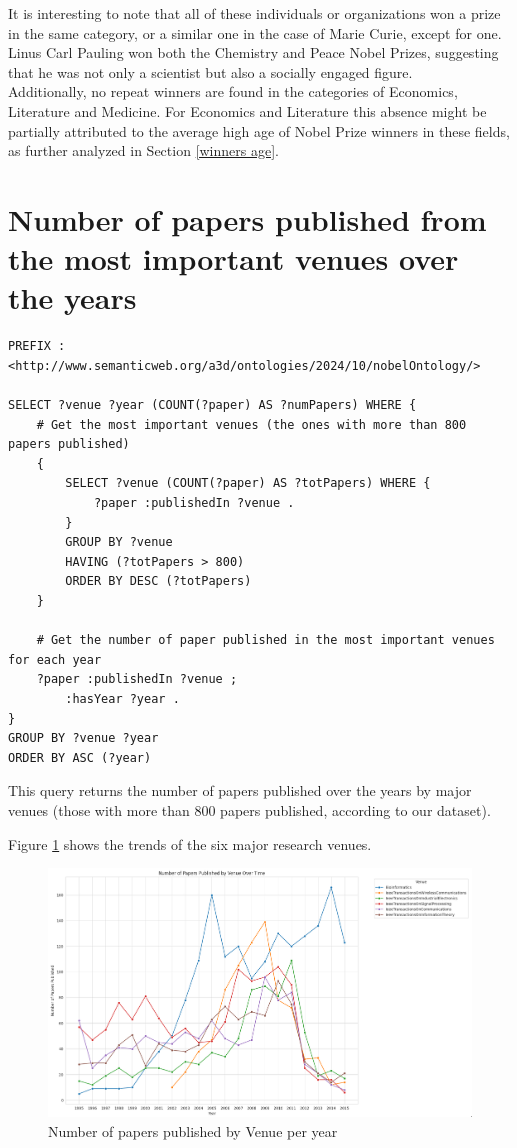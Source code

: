 \documentclass{article}
\begin{document}
It is interesting to note that all of these individuals or organizations won a prize in the same category,
or a similar one in the case of Marie Curie, except for one. Linus Carl Pauling won both the Chemistry and Peace Nobel Prizes,
suggesting that he was not only a scientist but also a socially engaged figure.\\
Additionally, no repeat winners are found in the categories of Economics, Literature and Medicine.
For Economics and Literature this absence might be partially attributed to the average high age of Nobel Prize
winners in these fields, as further analyzed in Section \ref{winners age}.\\

\newpage

\section{Number of papers published from the most important venues over the years}

\begin{lstlisting}
PREFIX : <http://www.semanticweb.org/a3d/ontologies/2024/10/nobelOntology/>

SELECT ?venue ?year (COUNT(?paper) AS ?numPapers) WHERE {
    # Get the most important venues (the ones with more than 800 papers published)
    {
        SELECT ?venue (COUNT(?paper) AS ?totPapers) WHERE {
            ?paper :publishedIn ?venue .
        }
        GROUP BY ?venue
        HAVING (?totPapers > 800)
        ORDER BY DESC (?totPapers)
    }

    # Get the number of paper published in the most important venues for each year
    ?paper :publishedIn ?venue ;
        :hasYear ?year .
}
GROUP BY ?venue ?year
ORDER BY ASC (?year)
\end{lstlisting}

\vspace{1em}

This query returns the number of papers published over the years by major
venues (those with more than 800 papers published, according to our dataset).

Figure \ref{fig:papersPerVenue} shows the trends of the six major research venues.

\begin{figure}[H]
	\centering
	\label{fig:papersPerVenue}
	\includegraphics[width=.99\textwidth]{../queries/plots/papersPerVenue.png}
	\caption{Number of papers published by Venue per year}
\end{figure}
\end{document}
